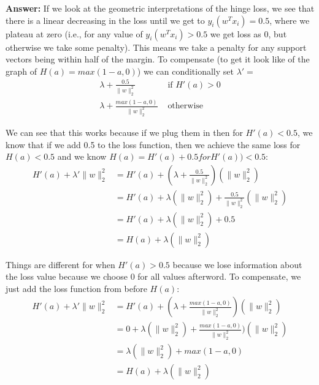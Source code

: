\documentclass[11pt]{article}
\begin{document}
\begin{enumerate}[(a)]
{\bf Answer: }
If we look at the geometric interpretations of the hinge loss, we see that there is a linear decreasing in the loss until we get to $y_i(w^Tx_i)=0.5$, where we plateau at zero (i.e., for any value of $y_i(w^T x_i) > 0.5$ we get loss as 0, but otherwise we take some penalty). This means we take a penalty for any support vectors being within half of the margin. To compensate (to get it look like of the graph of $H(a) = max(1-a, 0)$) we can conditionally set $\lambda ' = $
\begin{align*}
\lambda + \frac{0.5}{\|w\|_2^2} &\text{  if  } H'(a) > 0 				\\
\lambda + \frac{max(1-a, 0)}{{\|w\|_2^2}} &\text{  otherwise  }
\end{align*}

We can see that this works because if we plug them in then for $H'(a) < 0.5$, we know that if we add 0.5 to the loss function, then we achieve the same loss for $H(a) < 0.5$ and we know $H(a) = H'(a) + 0.5 for H'(a)) < 0.5$:
\begin{align*}
H'(a) + \lambda'\|w\|_2^2 &= H'(a) + (\lambda + \frac{0.5}{\|w\|_2^2})(\|w\|_2^2)	\\
&= H'(a) + \lambda(\|w\|_2^2) + \frac{0.5}{\|w\|_2^2} (\|w\|_2^2)				\\
&= H'(a) + \lambda(\|w\|_2^2) + 0.5										\\
&= H(a) + \lambda(\|w\|_2^2)
\end{align*}

Things are different for when $H'(a) > 0.5$ because we lose information about the loss value because we choose 0 for all values afterword. To compensate, we just add the loss function from before $H(a)$:
\begin{align*}
H'(a) + \lambda'\|w\|_2^2 &= H'(a) + (\lambda + \frac{max(1-a, 0)}{\|w\|_2^2})(\|w\|_2^2)	\\
&= 0 + \lambda(\|w\|_2^2) +  \frac{max(1-a, 0)}{\|w\|_2^2})(\|w\|_2^2)		\\
&= \lambda(\|w\|_2^2) +  max(1-a, 0)		\\
&= H(a) + \lambda(\|w\|_2^2)
\end{align*}
\end{enumerate}













\newpage
\end{document}
